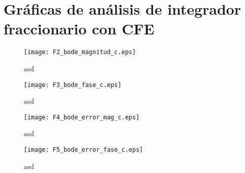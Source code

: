 \chapter{Gráficas de análisis de integrador fraccionario con CFE}

\begin{figure}[hbtp]
	\caption{asd}
	\centering
	\texttt{[image: F2\_bode\_magnitud\_c.eps]}
\end{figure}

\begin{figure}[hbtp]
	\caption{asd}
	\centering
	\texttt{[image: F3\_bode\_fase\_c.eps]}
\end{figure}

\begin{figure}[hbtp]
	\caption{asd}
	\centering
	\texttt{[image: F4\_bode\_error\_mag\_c.eps]}
\end{figure}

\begin{figure}[hbtp]
	\caption{asd}
	\centering
	\texttt{[image: F5\_bode\_error\_fase\_c.eps]}
\end{figure}
